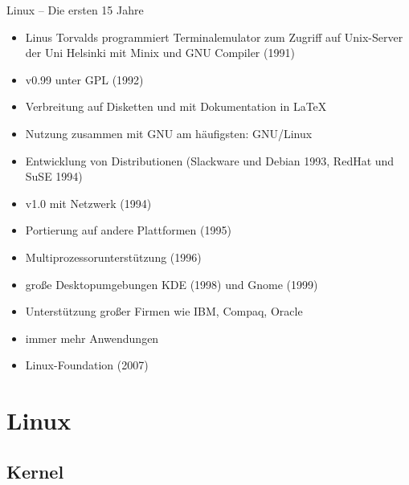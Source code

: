\documentclass{beamer}
\begin{document}
\begin{frame}{Linux -- Die ersten 15 Jahre}
    \begin{itemize}
        \item Linus Torvalds programmiert Terminalemulator zum Zugriff
            auf Unix-Server der Uni Helsinki mit Minix und GNU Compiler
            (1991)
        \item v0.99 unter GPL (1992)
        \item Verbreitung auf Disketten und mit Dokumentation in \LaTeX
        \item Nutzung zusammen mit GNU am häufigsten: GNU/Linux
        \item Entwicklung von Distributionen (Slackware und Debian 1993,
            RedHat und SuSE 1994)
        \item v1.0 mit Netzwerk (1994)
        \item Portierung auf andere Plattformen (1995)
        \item Multiprozessorunterstützung (1996)
        \item große Desktopumgebungen KDE (1998) und Gnome (1999)
        \item Unterstützung großer Firmen wie IBM, Compaq, Oracle
        \item immer mehr Anwendungen
        \item Linux-Foundation (2007)
    \end{itemize}
\end{frame}

\section{Linux}

\frame{\tableofcontents[currentsection]}

\subsection{Kernel}
\end{document}
